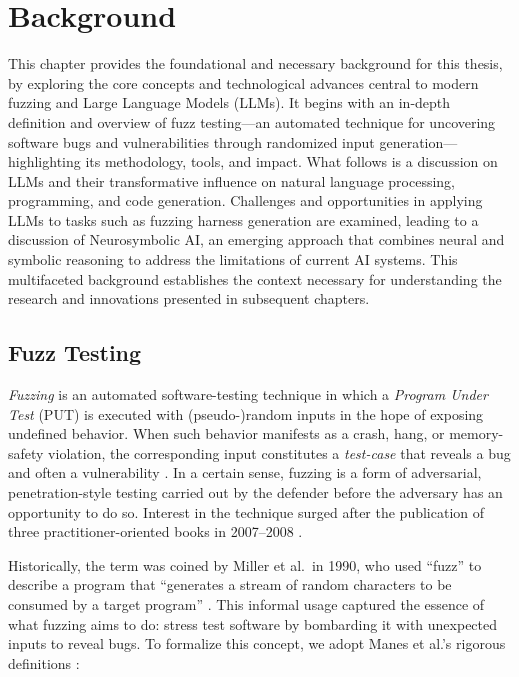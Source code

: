 \documentclass[
  a4paper,
]{scrreprt}
\theoremstyle{definition}
\theoremstyle{remark}
\begin{document}

\chapter{Background}\label{sec-background}

This chapter provides the foundational and necessary background for this
thesis, by exploring the core concepts and technological advances
central to modern fuzzing and Large Language Models (LLMs). It begins
with an in-depth definition and overview of fuzz testing---an automated
technique for uncovering software bugs and vulnerabilities through
randomized input generation---highlighting its methodology, tools, and
impact. What follows is a discussion on LLMs and their transformative
influence on natural language processing, programming, and code
generation. Challenges and opportunities in applying LLMs to tasks such
as fuzzing harness generation are examined, leading to a discussion of
Neurosymbolic AI, an emerging approach that combines neural and symbolic
reasoning to address the limitations of current AI systems. This
multifaceted background establishes the context necessary for
understanding the research and innovations presented in subsequent
chapters.

\section{Fuzz Testing}\label{fuzz-testing}

\emph{Fuzzing} is an automated software-testing technique in which a
\emph{Program Under Test} (PUT) is executed with (pseudo-)random inputs
in the hope of exposing undefined behavior. When such behavior manifests
as a crash, hang, or memory-safety violation, the corresponding input
constitutes a \emph{test-case} that reveals a bug and often a
vulnerability \autocite{manes2019}. In a certain sense, fuzzing is a
form of adversarial, penetration-style testing carried out by the
defender before the adversary has an opportunity to do so. Interest in
the technique surged after the publication of three
practitioner-oriented books in 2007--2008
\autocite{takanen2018,sutton2007,rathaus2007}.

Historically, the term was coined by Miller et al.~in 1990, who used
``fuzz'' to describe a program that ``generates a stream of random
characters to be consumed by a target program'' \autocite{miller1990}.
This informal usage captured the essence of what fuzzing aims to do:
stress test software by bombarding it with unexpected inputs to reveal
bugs. To formalize this concept, we adopt Manes et al.'s rigorous
definitions \autocite{manes2019}:
\end{document}
